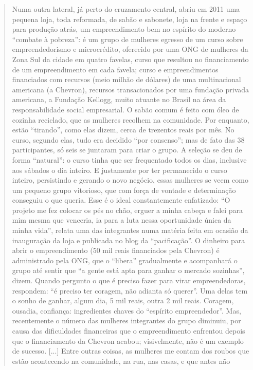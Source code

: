 \begin{quote}
Numa outra lateral, já perto do cruzamento central, abriu em 2011 uma
pequena loja, toda reformada, de sabão e sabonete, loja na frente e
espaço para produção atrás, um empreendimento bem no espírito do moderno
``combate à pobreza'': é um grupo de mulheres egresso de um curso sobre
empreendedorismo e microcrédito, oferecido por uma ONG de mulheres da
Zona Sul da cidade em quatro favelas, curso que resultou no
financiamento de um empreendimento em cada favela; curso e
empreendimentos financiados com recursos (meio milhão de dólares) de uma
multinacional americana (a Chevron), recursos transacionados por uma
fundação privada americana, a Fundação Kellogg, muito atuante no Brasil
na área da responsabilidade social empresarial. O sabão comum é feito
com óleo de cozinha reciclado, que as mulheres recolhem na comunidade.
Por enquanto, estão ``tirando'', como elas dizem, cerca de trezentos
reais por mês. No curso, segundo elas, tudo era decidido ``por
consenso''; mas de fato das 38 participantes, só seis se juntaram para
criar o grupo. A seleção se deu de forma ``natural'': o curso tinha que
ser frequentado todos os dias, inclusive aos sábados o dia inteiro. E
justamente por ter permanecido o curso inteiro, persistindo e gerando o
novo negócio, essas mulheres se veem como um pequeno grupo vitorioso,
que com força de vontade e determinação conseguiu o que queria. Esse é o
ideal constantemente enfatizado: ``O projeto me fez colocar os pés no
chão, erguer a minha cabeça e falei para mim mesma que venceria, ia para
a luta nessa oportunidade única da minha vida'', relata uma das
integrantes numa matéria feita em ocasião da inauguração da loja e
publicada no blog da ``pacificação''. O dinheiro para abrir o
empreendimento (50 mil reais financiados pela Chevron) é administrado
pela ONG, que o ``libera'' gradualmente e acompanhará o grupo até sentir
que ``a gente está apta para ganhar o mercado sozinhas'', dizem. Quando
pergunto o que é preciso fazer para virar empreendedoras, respondem: ``é
preciso ter coragem, não adianta só querer''. Uma delas tem o sonho de
ganhar, algum dia, 5 mil reais, outra 2 mil reais. Coragem, ousadia,
confiança: ingredientes chaves do ``espírito empreendedor''. Mas,
recentemente o número das mulheres integrantes do grupo diminuiu, por
causa das dificuldades financeiras que o empreendimento enfrentou depois
que o financiamento da Chevron acabou; visivelmente, não é um exemplo de
sucesso. {[}...{]} Entre outras coisas, as mulheres me contam dos roubos
que estão acontecendo na comunidade, na rua, nas casas, e que antes não

\end{quote}
